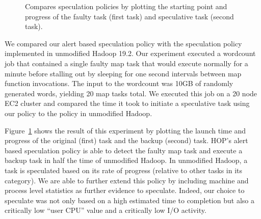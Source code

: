 \begin{figure}[ht]
\ssp
  \centering
  \caption{Compares speculation policies by plotting the starting point and progress of the faulty task (first task) and speculative task (second task).}
\label{fig:taskSpecPolicy}
\end{figure}

We compared our alert based speculation policy with the speculation policy
implemented in unmodified Hadoop 19.2.  Our experiment executed a wordcount job
that contained a single faulty map task that would execute normally for a
minute before stalling out by sleeping for one second intervals between map
function invocations.  The input to the wordcount was 10GB of randomly
generated words, yielding 20 map tasks total.  We executed this job on a 20
node EC2 cluster and compared the time it took to initiate a speculative task
using our policy to the policy in unmodified Hadoop.

Figure~\ref{fig:taskSpecPolicy} shows the result of this experiment by plotting
the launch time and progress of the original (first) task and the backup
(second) task.  HOP's alert based speculation policy is able to detect the
faulty map task and execute a backup task in half the time of unmodified
Hadoop.  In unmodified Hadoop, a task is speculated based on its rate of
progress (relative to other tasks in its category).  We are able to further
extend this policy by including machine and process level statistics as further
evidence to speculate.  Indeed, our choice to speculate was not only based on a
high estimated time to completion but also a critically low ``user CPU'' value
and a critically low I/O activity.

